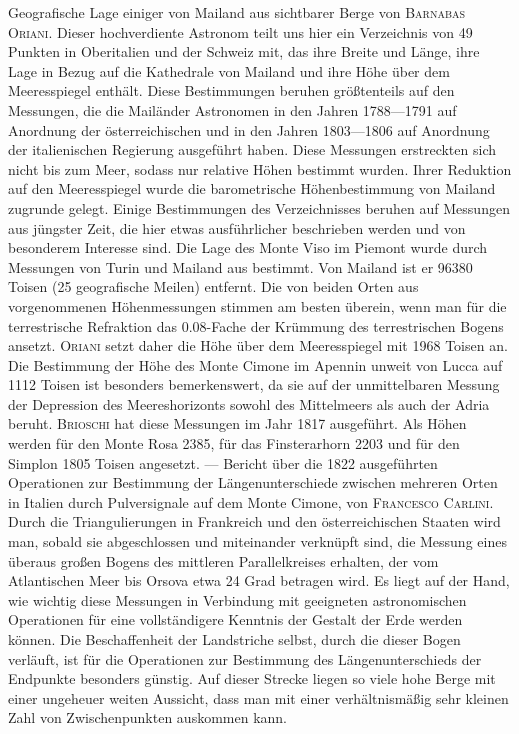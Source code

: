 Geografische Lage einiger von Mailand aus sichtbarer Berge von \textsc{Barnabas Oriani}.
Dieser hochverdiente Astronom teilt uns hier ein Verzeichnis von 49 Punkten in Oberitalien und der Schweiz mit, das ihre Breite und Länge, ihre Lage in Bezug auf die Kathedrale von Mailand und ihre Höhe über dem Meeresspiegel enthält.
Diese Bestimmungen beruhen größtenteils auf den Messungen, die die Mailänder Astronomen in den Jahren 1788---1791 auf Anordnung der österreichischen und in den Jahren 1803---1806 auf Anordnung der italienischen Regierung ausgeführt haben.
Diese Messungen erstreckten sich nicht bis zum Meer, sodass nur relative Höhen bestimmt wurden. Ihrer Reduktion auf den Meeresspiegel wurde die barometrische Höhenbestimmung von Mailand zugrunde gelegt.
Einige Bestimmungen des Verzeichnisses beruhen auf Messungen aus jüngster Zeit, die hier etwas ausführlicher beschrieben werden und von besonderem Interesse sind.
Die Lage des Monte Viso im Piemont wurde durch Messungen von Turin und Mailand aus bestimmt. Von Mailand ist er 96380 Toisen (25 geografische Meilen) entfernt.
Die von beiden Orten aus vorgenommenen Höhenmessungen stimmen am besten überein, wenn man für die terrestrische Refraktion das 0.08-Fache der Krümmung des terrestrischen Bogens ansetzt. \textsc{Oriani} setzt daher die Höhe über dem Meeresspiegel mit 1968 Toisen an.
Die Bestimmung der Höhe des Monte Cimone im Apennin unweit von Lucca auf 1112 Toisen ist besonders bemerkenswert, da sie auf der unmittelbaren Messung der Depression des Meereshorizonts sowohl des Mittelmeers als auch der Adria beruht. \textsc{Brioschi} hat diese Messungen im Jahr 1817 ausgeführt.
Als Höhen werden für den Monte Rosa 2385, für das Finsterarhorn 2203 und für den Simplon 1805 Toisen angesetzt. --- Bericht über die 1822 ausgeführten Operationen zur Bestimmung der Längenunterschiede zwischen mehreren Orten in Italien durch Pulversignale auf dem Monte Cimone, von \textsc{Francesco Carlini}.
Durch die Triangulierungen in Frankreich und den österreichischen Staaten wird man, sobald sie abgeschlossen und miteinander verknüpft sind, die Messung eines überaus großen Bogens des mittleren Parallelkreises erhalten, der vom Atlantischen Meer bis Orsova etwa 24 Grad betragen wird.
Es liegt auf der Hand, wie wichtig diese Messungen in Verbindung mit geeigneten astronomischen Operationen für eine vollständigere Kenntnis der Gestalt der Erde werden können.
Die Beschaffenheit der Landstriche selbst, durch die dieser Bogen verläuft, ist für die Operationen zur Bestimmung des Längenunterschieds der Endpunkte besonders günstig. Auf dieser Strecke liegen so viele hohe Berge mit einer ungeheuer weiten Aussicht, dass man mit einer verhältnismäßig sehr kleinen Zahl von Zwischenpunkten auskommen kann.
